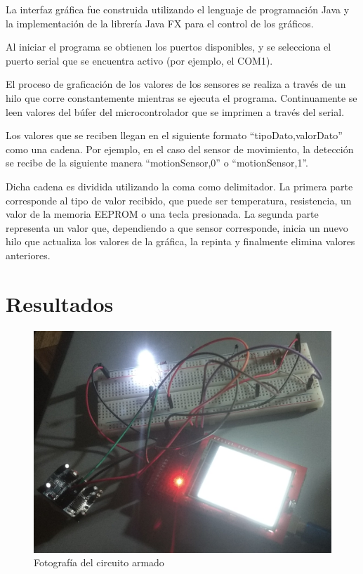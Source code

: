 \documentclass[conference]{IEEEtran}
\begin{document}
La interfaz gráfica fue construida utilizando el lenguaje de programación Java y la implementación de la librería Java FX para el control de los gráficos.

Al iniciar el programa se obtienen los puertos disponibles, y se selecciona el puerto serial que se encuentra activo (por ejemplo, el COM1).

El proceso de graficación de los valores de los sensores se realiza a través de un hilo que corre constantemente mientras se ejecuta el programa. Continuamente se leen valores del búfer del microcontrolador que se imprimen a través del serial. 

Los valores que se reciben llegan en el siguiente formato “tipoDato,valorDato” como una cadena. Por ejemplo, en el caso del sensor de movimiento, la detección se recibe de la siguiente manera “motionSensor,0” o “motionSensor,1”.

Dicha cadena es dividida utilizando la coma como delimitador. La primera parte corresponde al tipo de valor recibido, que puede ser temperatura, resistencia, un valor de la memoria EEPROM o una tecla presionada. La segunda parte representa un valor que, dependiendo a que sensor corresponde, inicia un nuevo hilo que actualiza los valores de la gráfica, la repinta y finalmente elimina valores anteriores.

\section{Resultados}

\begin{figure}
  \includegraphics[width=\linewidth]{fig4_photo_Circuit.png}
  \caption{Fotografía del circuito armado}
  \label{fig:photo1}
\end{figure}
\end{document}
